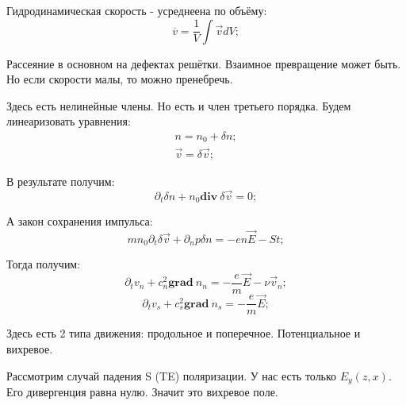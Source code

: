 \documentclass[a4paper, 14pt, russian]{article}
\newcommand{\be}{\begin{equation}}
\newcommand{\ee}{\end{equation}}
\newcommand{\pa}{\partial}
\renewcommand{\div}{\textbf{div}~}
\renewcommand{\grad}{\textbf{grad}~}
\begin{document}
		Гидродинамическая скорость - усреднеена по объёму:
		\be
			\overline{v} = \frac{1}{V} \int \vec v d V;
		\ee

		Рассеяние в основном на дефектах решётки. Взаимное превращение может быть.
		Но если скорости малы, то можно пренебречь. 

		Здесь есть нелинейные члены. Но есть и член третьего порядка. Будем линеаризовать уравнения:
		\begin{eqnarray}
				n = n_0 + \delta n;\\
				\vec v = \delta \vec v;
		\end{eqnarray}

		В результате получим:
		\be
			\pa_t \delta n + n_0 \div \delta \vec v = 0;
		\ee

		А закон сохранения импульса:
		\be
			mn_0 \pa_t \delta \vec v + \pa_n p \delta n = - e n \vec E - St;
		\ee

		Тогда получим:
		\be
			\pa_t v_n + c_n^2 \grad n_n = - \frac{e}{m} \vec E -  \nu \vec{v}_n;
		\ee
		\be
			\pa_t v_s + c_s^2 \grad n_s = - \frac{e}{m} \vec E;
		\ee

		Здесь есть 2 типа движения: продольное и поперечное. Потенциальное и вихревое.

		Рассмотрим случай падения S (TE) поляризации. У нас есть только $E_y(z,x)$. 
		Его дивергенция равна нулю. Значит это вихревое поле. 
\end{document}
